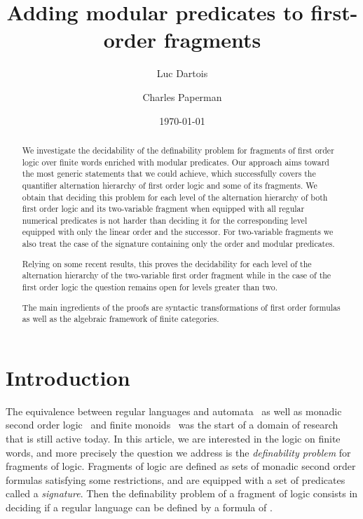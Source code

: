 \documentclass[submission,hidelink]{dmtcs-episciences}
\author[L. Dartois, C. Paperman]{Luc Dartois\affiliationmark{1,2}
  \and Charles Paperman\affiliationmark{3}}
\title[Adding modular predicates]{Adding modular predicates to first-order fragments}
\affiliation{
LIF, Aix-Marseille Université, France\\
  Université Libre de Bruxelles, Belgium\\
  Warsaw University, Poland}
\date{\today}
\begin{document}
\maketitle

\begin{abstract}
We investigate the decidability of the definability problem for fragments of first order logic over finite words enriched with modular predicates.
Our approach aims toward the most generic statements that we could achieve, which successfully covers the quantifier alternation hierarchy of first order logic and some of its fragments.
 We obtain that deciding this problem for each level of the alternation hierarchy of
 both first order logic and its two-variable fragment when equipped with all regular numerical predicates
 is not harder than deciding it for the corresponding level
 equipped with only the linear order and the successor. For two-variable fragments we also treat the case of the signature containing
 only the order
 and modular predicates.

Relying on some recent results, this proves the decidability for each level of the alternation hierarchy of the two-variable first order fragment
while in the case of the first order logic the question remains open for levels greater than two.

The main ingredients of the proofs are syntactic transformations of first order formulas as well as the algebraic framework of finite categories.
\end{abstract}



\section{Introduction}

The equivalence between regular languages and automata~\citep{RabinScott59}
 as well as monadic second order
logic~\citep{Buchi60} and finite monoids~\citep{Nerode59} was the start of a
domain of research that is still active today.
	In this article, we are  interested in the logic on finite words, and more precisely the
	question we address is the \emph{definability problem} for fragments of logic.
	Fragments of logic are defined as sets of monadic second order formulas satisfying some restrictions, and are
	equipped with a set of predicates called a \emph{signature}.
	Then the definability problem of a fragment of logic  consists in deciding
	 if
	a regular language can be defined by a formula of .
\end{document}
